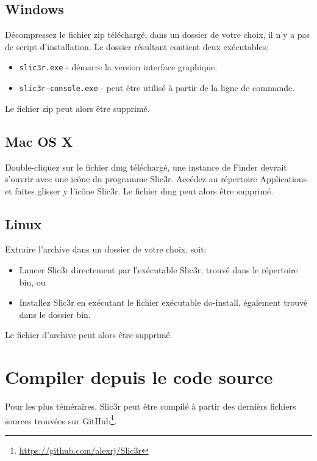 \subsection{Windows}

D\'ecompressez le fichier zip t\'el\'echarg\'e, dans un dossier de votre choix, il n'y a pas de script d'installation. Le dossier r\'esultant contient deux ex\'ecutables:
\begin{itemize}
\item \texttt{slic3r.exe} - d\'emarre la version interface graphique.
\item \texttt{slic3r-console.exe} - peut \^etre utilis\'e \`a partir de la ligne de commande.
\end{itemize}

Le fichier zip peut alors \^etre supprim\'e.

\subsection{Mac OS X}

Double-cliquez sur le fichier dmg t\'el\'echarg\'e, une instance de Finder devrait s'ouvrir avec une ic\^one du programme Slic3r. Acc\'edez au r\'epertoire Applications et faites glisser y l'ic\^one Slic3r.
Le fichier dmg peut alors \^etre supprim\'e.

\subsection{Linux}

Extraire l'archive dans un dossier de votre choix.
soit:
\begin{itemize}
\item Lancer Slic3r directement par l'ex\'ecutable Slic3r, trouv\'e dans le r\'epertoire bin, ou
\item Installez Slic3r en ex\'ecutant le fichier ex\'ecutable do-install, \'egalement trouv\'e dans le dossier bin.
\end{itemize}
Le fichier d'archive peut alors \^etre supprim\'e.



\section{Compiler depuis le code source} %
\label{sec:building_from_source}

Pour les plus t\'em\'eraires, Slic3r peut \^etre compil\'e \`a partir des derni\`ers fichiers sources trouv\'ees sur GitHub\footnote{\url{https://github.com/alexrj/Slic3r}}.

